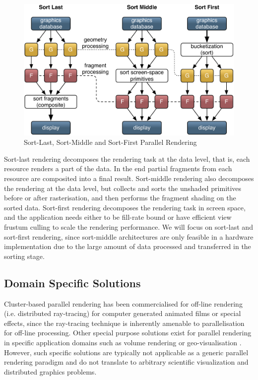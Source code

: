 \begin{figure}[h!t]\center
 \includegraphics[width=\textwidth]{images/all_sorts}%
 \caption{Sort-Last, Sort-Middle and Sort-First Parallel Rendering\label{fSorts}}
\end{figure}

Sort-last rendering decomposes the rendering task at the data level, that is,
each resource renders a part of the data. In the end partial fragments from
each resource are composited into a final result. Sort-middle rendering
also decomposes the rendering at the data level, but collects and sorts the
unshaded primitives before or after rasterisation, and then performs the
fragment shading on the sorted data. Sort-first rendering decomposes the
rendering task in screen space, and the application needs either to be
fill-rate bound or have efficient view frustum culling to scale the rendering
performance. We will focus on sort-last and sort-first rendering, since
sort-middle architectures are only feasible in a hardware implementation due to
the large amount of data processed and transferred in the sorting stage.


\subsection{Domain Specific Solutions}

Cluster-based parallel rendering has been commercialised for off-line rendering
(i.e. distributed ray-tracing) for computer generated animated films or special
effects, since the ray-tracing technique is inherently amenable to
parallelisation for off-line processing. Other special purpose solutions exist
for parallel rendering in specific application domains such as volume rendering
\cite{LWMT:97,Wittenbrink:98,HSCSM:00,SL:02,GS:02,NSJLYZ:05} or
geo-visualisation \cite{VR:91,AG:95,LDC:96,JLMV:06}. However, such specific
solutions are typically not applicable as a generic parallel rendering paradigm
and do not translate to arbitrary scientific visualization and distributed
graphics problems.

